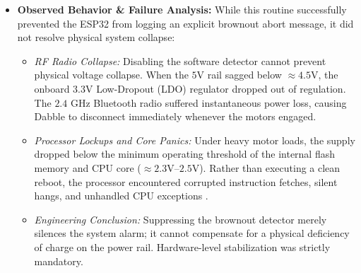 \documentclass[journal,12pt,onecolumn]{IEEEtran}
\begin{document}
\begin{itemize}
	\item \textbf{Observed Behavior \& Failure Analysis:} While this routine successfully prevented the ESP32 from logging an explicit brownout abort message, it did not resolve physical system collapse: %
	\begin{itemize}
		\item \textit{RF Radio Collapse:} Disabling the software detector cannot prevent physical voltage collapse. When the $5\text{V}$ rail sagged below $\approx 4.5\text{V}$, the onboard $3.3\text{V}$ Low-Dropout (LDO) regulator dropped out of regulation. %
		The $2.4\text{ GHz}$ Bluetooth radio suffered instantaneous power loss, causing Dabble to disconnect immediately whenever the motors engaged. %
		\item \textit{Processor Lockups and Core Panics:} Under heavy motor loads, the supply dropped below the minimum operating threshold of the internal flash memory and CPU core ($\approx 2.3\text{V--}2.5\text{V}$). Rather than executing a clean reboot, the processor encountered corrupted instruction fetches, silent hangs, and unhandled CPU exceptions .
		\item \textit{Engineering Conclusion:} Suppressing the brownout detector merely silences the system alarm; it cannot compensate for a physical deficiency of charge on the power rail. %
		Hardware-level stabilization was strictly mandatory.
	\end{itemize}
\end{itemize}
\end{document}
